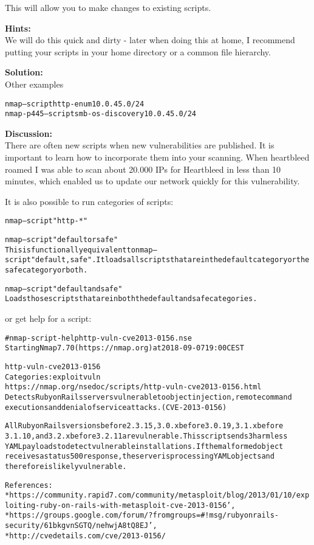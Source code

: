 \documentclass[a4paper,11pt,notitlepage]{report}
\begin{document}
This will allow you to make changes to existing scripts.

{\bf Hints:} \\
We will do this quick and dirty - later when doing this at home, I recommend putting your scripts in your home directory or a common file hierarchy.

{\bf Solution:}\\
Other examples
\begin{alltt}
nmap --script http-enum 10.0.45.0/24
nmap -p 445 --script smb-os-discovery 10.0.45.0/24
\end{alltt}


{\bf Discussion:}\\
There are often new scripts when new vulnerabilities are published. It is important to learn how to incorporate them into your scanning. When heartbleed roamed I was able to scan about 20.000 IPs for Heartbleed in less than 10 minutes, which enabled us to update our network quickly for this vulnerability.

It is also possible to run categories of scripts:

\begin{alltt}
nmap --script "http-*"

		   nmap --script "default or safe"
			   This is functionally equivalent to nmap --script "default,safe". It loads all scripts that are in the default category or the safe category or both.

		   nmap --script "default and safe"
			   Loads those scripts that are in both the default and safe categories.
\end{alltt}

or get help for a script:

\begin{alltt}
# nmap -script-help http-vuln-cve2013-0156.nse
Starting Nmap 7.70 ( https://nmap.org ) at 2018-09-07 19:00 CEST

http-vuln-cve2013-0156
Categories: exploit vuln
https://nmap.org/nsedoc/scripts/http-vuln-cve2013-0156.html
  Detects Ruby on Rails servers vulnerable to object injection, remote command
  executions and denial of service attacks. (CVE-2013-0156)

  All Ruby on Rails versions before 2.3.15, 3.0.x before 3.0.19, 3.1.x before
  3.1.10, and 3.2.x before 3.2.11 are vulnerable. This script sends 3 harmless
  YAML payloads to detect vulnerable installations. If the malformed object
  receives a status 500 response, the server is processing YAML objects and
  therefore is likely vulnerable.

  References:
  * https://community.rapid7.com/community/metasploit/blog/2013/01/10/exploiting-ruby-on-rails-with-metasploit-cve-2013-0156',
  * https://groups.google.com/forum/?fromgroups=#!msg/rubyonrails-security/61bkgvnSGTQ/nehwjA8tQ8EJ',
  * http://cvedetails.com/cve/2013-0156/
\end{alltt}
\end{document}
